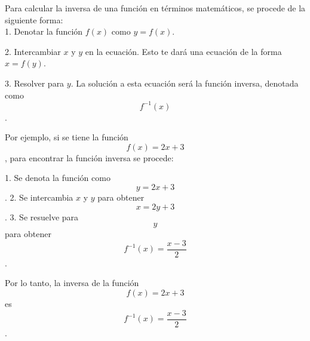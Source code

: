 \documentclass[a4paper,12pt]{article}
\begin{document}
Para calcular la inversa de una función en términos matemáticos, se procede de la siguiente forma:\\

1. Denotar la función $f(x)$ como $y = f(x)$.

2. Intercambiar $x$ y $y$ en la ecuación. Esto te dará una ecuación de la forma $x = f(y)$.

3. Resolver para $y$. La solución a esta ecuación será la función inversa, denotada como $$f^{-1}(x)$$.

Por ejemplo, si se tiene la función $$f(x) = 2x + 3$$, para encontrar la función inversa se procede:

1. Se denota la función como $$y = 2x + 3$$.
2. Se intercambia $x$ y $y$ para obtener $$x = 2y + 3$$.
3. Se resuelve para $$y$$ para obtener $$f^{-1}(x) = \frac{x - 3}{2}$$.

Por lo tanto, la inversa de la función $$f(x) = 2x + 3$$ es $$f^{-1}(x) = \frac{x - 3}{2}$$.
\end{document}

